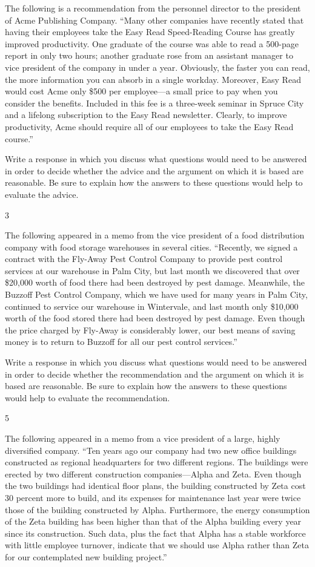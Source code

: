 \documentclass[]{article}
\begin{document}
The following is a recommendation from the personnel director to the
president of Acme Publishing Company. ``Many other companies have
recently stated that having their employees take the Easy Read
Speed-Reading Course has greatly improved productivity. One graduate of
the course was able to read a 500-page report in only two hours; another
graduate rose from an assistant manager to vice president of the company
in under a year. Obviously, the faster you can read, the more
information you can absorb in a single workday. Moreover, Easy Read
would cost Acme only \$500 per employee---a small price to pay when you
consider the benefits. Included in this fee is a three-week seminar in
Spruce City and a lifelong subscription to the Easy Read newsletter.
Clearly, to improve productivity, Acme should require all of our
employees to take the Easy Read course.''

Write a response in which you discuss what questions would need to be
answered in order to decide whether the advice and the argument on which
it is based are reasonable. Be sure to explain how the answers to these
questions would help to evaluate the advice.

3

The following appeared in a memo from the vice president of a food
distribution company with food storage warehouses in several cities.
``Recently, we signed a contract with the Fly-Away Pest Control Company
to provide pest control services at our warehouse in Palm City, but last
month we discovered that over \$20,000 worth of food there had been
destroyed by pest damage. Meanwhile, the Buzzoff Pest Control Company,
which we have used for many years in Palm City, continued to service our
warehouse in Wintervale, and last month only \$10,000 worth of the food
stored there had been destroyed by pest damage. Even though the price
charged by Fly-Away is considerably lower, our best means of saving
money is to return to Buzzoff for all our pest control services.''

Write a response in which you discuss what questions would need to be
answered in order to decide whether the recommendation and the argument
on which it is based are reasonable. Be sure to explain how the answers
to these questions would help to evaluate the recommendation.

5

The following appeared in a memo from a vice president of a large,
highly diversified company. ``Ten years ago our company had two new
office buildings constructed as regional headquarters for two different
regions. The buildings were erected by two different construction
companies---Alpha and Zeta. Even though the two buildings had identical
floor plans, the building constructed by Zeta cost 30 percent more to
build, and its expenses for maintenance last year were twice those of
the building constructed by Alpha. Furthermore, the energy consumption
of the Zeta building has been higher than that of the Alpha building
every year since its construction. Such data, plus the fact that Alpha
has a stable workforce with little employee turnover, indicate that we
should use Alpha rather than Zeta for our contemplated new building
project.''
\end{document}
